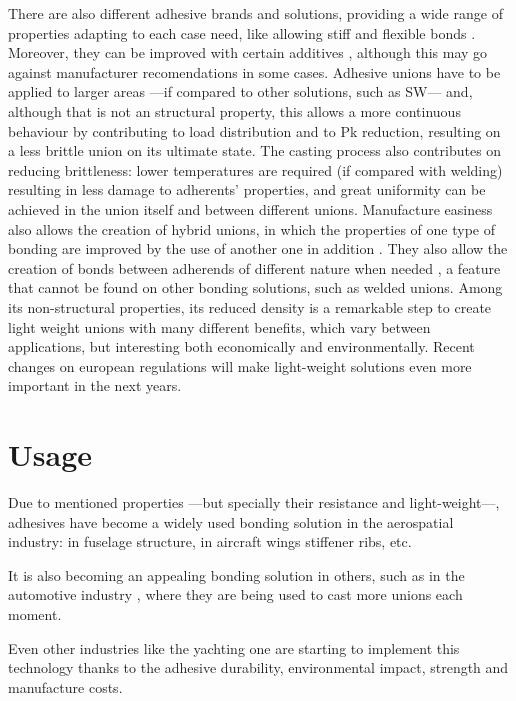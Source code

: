 There are also different adhesive brands and solutions, providing a wide range of properties adapting to each case need, like allowing stiff and flexible bonds \citep{Loureiro2010}. Moreover, they can be improved with certain additives \citep{Vaidya2006}, although this may go against manufacturer recomendations in some cases.
Adhesive unions have to be applied to larger areas ---if compared to other solutions, such as \gls{SW}--- and, although that is not an structural property, this allows a more continuous behaviour \citep{Vaidya2006, Liao2011} by contributing to load distribution and to \gls{Pk} reduction, resulting on a less brittle union on its ultimate state.
The casting process also contributes on reducing brittleness: lower temperatures are required (if compared with welding) resulting in less damage to adherents’ properties, and great uniformity can be achieved in the union itself and between different unions. Manufacture easiness also allows the creation of hybrid unions, in which the properties of one type of bonding are improved by the use of another one in addition \citep{Sadowski2010, Sadowski2011}. They also allow the creation of bonds between adherends of different nature when needed \citep{Wu2013}, a feature that cannot be found on other bonding solutions, such as welded unions.
Among its non-structural properties, its reduced density is a remarkable step to create light weight unions with many different benefits, which vary between applications, but interesting both economically and environmentally. Recent changes on european regulations \citep{pistonudos} will make light-weight solutions even more important in the next years.

\section{Usage}
Due to mentioned properties ---but specially their resistance and light-weight---, adhesives have become a widely used bonding solution in the aerospatial industry: in fuselage structure, in aircraft wings stiffener ribs, etc.

It is also becoming an appealing bonding solution in others, such as in the automotive industry \citep{Wu2006, Greve2007, Grant2009, Scattina2011, Kadioglu2014, SernaMoreno2015}, where they are being used to cast more unions each moment.

Even other industries like the yachting one \citep{superyacht} are starting to implement this technology thanks to the adhesive durability, environmental impact, strength and manufacture costs.

